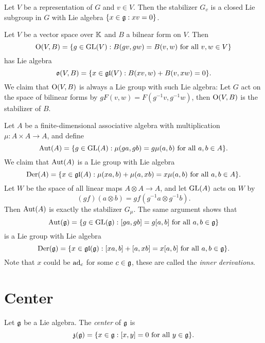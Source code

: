 \begin{corollary}
  Let $V$ be a representation of
  $G$ and $v \in V$. Then the
  stabilizer $G_v$ is a closed Lie
  subgroup in $G$ with
  Lie algebra
  $\{x \in \mathfrak{g} : x v = 0\}$.
\end{corollary}

\begin{example}
  Let $V$ be a vector space over
  $\mathbb{K}$ and $B$ a bilnear form on $V$.
  Then
  \[
    \operatorname{O}(V, B)
    = \{
      g \in \operatorname{GL}(V) :
      B(gv, gw) = B(v, w) \text{ for all } v, w \in V
    \}
  \]
  has Lie algebra
  \[
    \mathfrak{o}(V, B)
    = \{
      x \in \mathfrak{gl}(V) :
      B(xv, w) + B(v, xw) = 0
    \}.
  \]
  We claim that $\operatorname{O}(V, B)$ is
  always a Lie group with such Lie
  algebra: Let $G$ act on the space
  of bilinear forms by
  $g F(v, w) = F(g^{-1} v, g^{-1} w)$,
  then $\operatorname{O}(V, B)$ is the stabilizer
  of $B$.
\end{example}

\begin{example}
  Let $A$ be a finite-dimensional
  associative algebra with multiplication
  $\mu : A \times A \to A$, and define
  \[
    \operatorname{Aut}(A) =
    \{
      g \in \operatorname{GL}(A) : 
      \mu(ga, gb) = g \mu(a, b) \text{ for all } a, b \in A
    \}.
  \]
  We claim that $\operatorname{Aut}(A)$ is a
  Lie group with Lie algebra
  \[
    \operatorname{Der}(A)
    = \{
      x \in \mathfrak{gl}(A) :
      \mu(xa, b) + \mu(a, xb)
      = x \mu(a, b) \text{ for all } a, b \in A
    \}.
  \]
  Let $W$ be the space of all
  linear maps $A \otimes A \to A$, and
  let $\operatorname{GL}(A)$ acts on $W$ by
  \[
    (gf)(a \otimes b)
    = gf(g^{-1} a \otimes g^{-1} b).
  \]
  Then $\operatorname{Aut}(A)$ is exactly the
  stabilizer $G_\mu$. The same
  argument shows that
  \[
    \operatorname{Aut}(\mathfrak{g})
    = \{
      g \in \operatorname{GL}(\mathfrak{g})
      : [ga, gb] = g[a, b]
      \text{ for all } a, b \in \mathfrak{g}
    \}
  \]
  is a Lie group with Lie algebra
  \[
    \operatorname{Der}(\mathfrak{g})
    = \{
      x \in \mathfrak{gl}(\mathfrak{g}) :
      [xa, b] + [a, xb] = x[a, b]
      \text{ for all } a, b \in \mathfrak{g}
    \}.
  \]
  Note that $x$ could be $\operatorname{ad}_c$
  for some $c \in \mathfrak{g}$, these are
  called the \emph{inner derivations}.
\end{example}

\section{Center}

\begin{definition}
  Let $\mathfrak{g}$ be a Lie algebra. The
  \emph{center} of $\mathfrak{g}$ is
  \[
    \mathfrak{z}(\mathfrak{g})
    = \{
      x \in \mathfrak{g} : [x, y] = 0
      \text{ for all } y \in \mathfrak{g}
    \}.
  \]
\end{definition}

